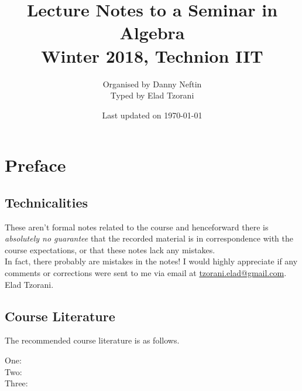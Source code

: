 \documentclass[10pt,a4paper,twoside,openany,hidelinks]{book}
\title{Lecture Notes to a Seminar in Algebra \\ \large{Winter 2018, Technion IIT}}
\author{Organised by Danny Neftin \\ \large Typed by Elad Tzorani}
\date{Last updated on \today}
\begin{document}
\frontmatter
{}
\tableofcontents
\countlectures
\newpage

\chapter*{Preface}
 

\section*{Technicalities}

These aren't formal notes related to the course and henceforward there is \emph{absolutely no guarantee} that the recorded material is in correspondence with the course expectations, or that these notes lack any mistakes.\\
In fact, there probably are mistakes in the notes! I would highly appreciate if any comments or corrections were sent to me via email at \href{mailto:tzorani.elad@gmail.com}{tzorani.elad@gmail.com}.\\
Elad Tzorani.

\section*{Course Literature}

The recommended course literature is as follows. %
\begin{description}
\item[One:]

\item[Two:]

\item[Three:]
\end{description}

\mainmatter


\backmatter
\end{document}
